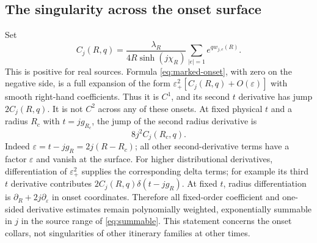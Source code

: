 \subsection{The singularity across the onset surface}
Set
\[
 C_j(R,q)=\frac{\lambda_R}{4R\sinh(j\chi_R)}
                    \sum_{|e|=1}e^{qw_{j,e}(R)}.
\]
This is positive for real sources. Formula \eqref{eq:marked-onset},
with zero on the negative side, is a full expansion of the form
$\varepsilon_+^2[C_j(R,q)+O(\varepsilon)]$ with smooth right-hand
coefficients. Thus it is $C^1$, and its second $t$ derivative has jump
$2C_j(R,q)$. It is not $C^2$ across any of these onsets. At fixed
physical $t$ and a radius $R_c$ with $t=jg_{R_c}$, the jump of the
second radius derivative is
\begin{equation}\label{eq:radius-jump}
                 8j^2 C_j(R_c,q).
\end{equation}
Indeed $\varepsilon=t-jg_R=2j(R-R_c)$; all other second-derivative
terms have a factor $\varepsilon$ and vanish at the surface.
For higher distributional derivatives, differentiation of
$\varepsilon_+^2$ supplies the corresponding delta terms; for example
its third $t$ derivative contributes $2C_j(R,q)\delta(t-jg_R)$.
At fixed $t$, radius differentiation is
$\partial_R+2j\partial_\varepsilon$ in onset coordinates. Therefore
all fixed-order coefficient and one-sided derivative estimates remain
polynomially weighted, exponentially summable in $j$ in the source
range of \eqref{eq:summable}. This statement concerns the onset
collars, not singularities of other itinerary families at other times.
